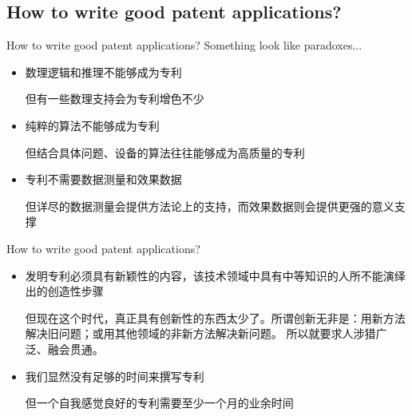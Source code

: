 \documentclass{beamer}
\begin{document}
\subsection{How to write good patent applications?}
\begin{frame}{How to write good patent applications?}
Something look like paradoxes...
\pause 
\begin{itemize}
\item 数理逻辑和推理不能够成为专利

但有一些数理支持会为专利增色不少
\item 纯粹的算法不能够成为专利

但结合具体问题、设备的算法往往能够成为高质量的专利
\item 专利不需要数据测量和效果数据

但详尽的数据测量会提供方法论上的支持，而效果数据则会提供更强的意义支撑
\end{itemize}
\end{frame}

\begin{frame}{How to write good patent applications?}
\begin{itemize}
\item 发明专利必须具有新颖性的内容，该技术领域中具有中等知识的人所不能演绎出的创造性步骤

但现在这个时代，真正具有创新性的东西太少了。所谓创新无非是：用新方法解决旧问题；或用其他领域的非新方法解决新问题。
所以就要求人涉猎广泛、融会贯通。
\item 我们显然没有足够的时间来撰写专利

但一个自我感觉良好的专利需要至少一个月的业余时间
\end{itemize}
\end{frame}
\end{document}
